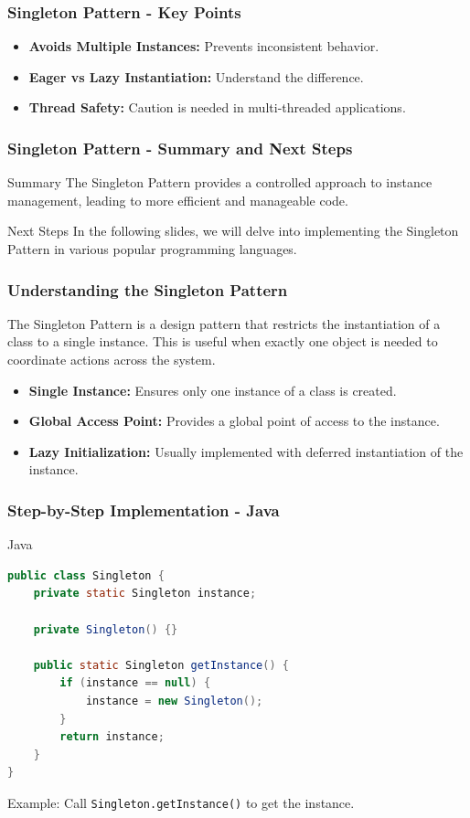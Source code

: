 \documentclass{beamer}
\begin{document}
\begin{frame}[fragile]
    \frametitle{Singleton Pattern - Key Points}
    \begin{itemize}
        \item \textbf{Avoids Multiple Instances:} Prevents inconsistent behavior.
        \item \textbf{Eager vs Lazy Instantiation:} Understand the difference.
        \item \textbf{Thread Safety:} Caution is needed in multi-threaded applications.
    \end{itemize}
\end{frame}

\begin{frame}[fragile]
    \frametitle{Singleton Pattern - Summary and Next Steps}
    \begin{block}{Summary}
    The Singleton Pattern provides a controlled approach to instance management, leading to more efficient and manageable code.
    \end{block}

    \begin{block}{Next Steps}
    In the following slides, we will delve into implementing the Singleton Pattern in various popular programming languages.
    \end{block}
\end{frame}

\begin{frame}[fragile]
    \frametitle{Understanding the Singleton Pattern}
    The Singleton Pattern is a design pattern that restricts the instantiation of a class to a single instance. This is useful when exactly one object is needed to coordinate actions across the system.

    \begin{itemize}
        \item \textbf{Single Instance:} Ensures only one instance of a class is created.
        \item \textbf{Global Access Point:} Provides a global point of access to the instance.
        \item \textbf{Lazy Initialization:} Usually implemented with deferred instantiation of the instance.
    \end{itemize}
\end{frame}

\begin{frame}[fragile]
    \frametitle{Step-by-Step Implementation - Java}
    \begin{block}{Java}
    \begin{lstlisting}[language=Java]
public class Singleton {
    private static Singleton instance;

    private Singleton() {}

    public static Singleton getInstance() {
        if (instance == null) {
            instance = new Singleton();
        }
        return instance;
    }
}
    \end{lstlisting}
    \end{block}
    Example: Call \texttt{Singleton.getInstance()} to get the instance.
\end{frame}
\end{document}
